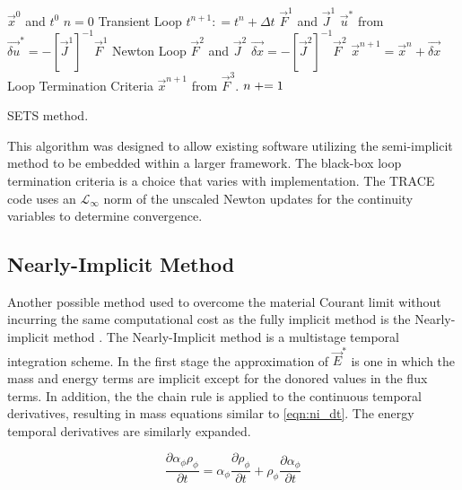 \begin{algo}[ht!]
\setlength{\baselineskip}{0.625\baselineskip}
\begin{algorithmic}[1]
\Require $\vec{x}^{0}$ and $t^{0}$
\Set $n = 0$
\Loop \; Transient Loop
    \Set $t^{n+1} : = t^{n} + \Delta t$
	\Calculate $\vec{F}^{1}$ and $\vec{J}^{1}$
	\Calculate $\vec{u}^{*}$ from $\vec{\delta u}^{*} = -\left[\vec{J}^{1}\right]^{-1} \vec{F}^{1}$
	\Loop \; Newton Loop
		\Calculate $\vec{F}^{2}$ and $\vec{J}^{2}$
		\Calculate $\vec{\delta x} = - \left[\vec{J}^{2}\right]^{-1} \vec{F}^{2}$
		\Calculate $\vec{x}^{n+1} = \vec{x}^{n} + \vec{\delta x}$
		\BlackBox Loop Termination Criteria
	\EndLoop
	\Calculate $\vec{x}^{n+1}$ from $\vec{F}^{3}$.
	\Set $n \mathrel{+}= 1$
\EndLoop
\end{algorithmic}
\caption{SETS method.}
\label{alg:sets}
\end{algo}

This algorithm was designed to allow existing software utilizing the semi-implicit method to be embedded within a larger framework.
The black-box loop termination criteria is a choice that varies with implementation.
The TRACE code uses an $\mathcal{L}_{\infty}$ norm of the unscaled Newton updates for the continuity variables to determine convergence.

\subsection{Nearly-Implicit Method}
\label{subsect:numerics_nearly_implicit}
Another possible method used to overcome the material Courant limit without incurring the same computational cost as the fully implicit method is the Nearly-implicit method \cite{Trapp1986, RELAP}.
The Nearly-Implicit method is a multistage temporal integration scheme.
In the first stage the approximation  of $\vec{E}^{*}$ is one in which the mass and energy terms are implicit except for the donored values in the flux terms. 
In addition, the the chain rule is applied to the continuous temporal derivatives, resulting in mass equations similar to \eqref{eqn:ni_dt}.
The energy temporal derivatives are similarly expanded.

\begin{equation}
\label{eqn:ni_dt}
\frac{\partial \alpha_{\phi} \rho_{\phi}}{\partial t} = \alpha_{\phi} \frac{\partial \rho_{\phi}}{\partial t} + \rho_{\phi} \frac{\partial \alpha_{\phi}}{\partial t}
\end{equation}

